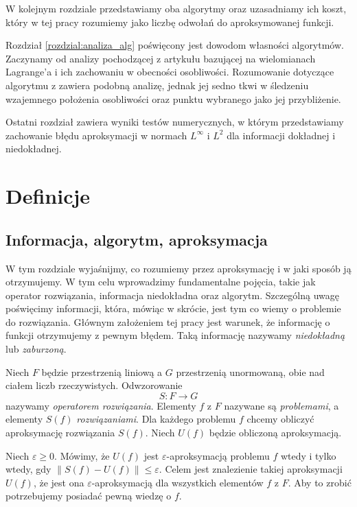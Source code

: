\documentclass[oik, pdftex, man]{mgrwms}
\begin{document}
\begin{wstep}[Wprowadzenie]
    W kolejnym rozdziale przedstawiamy oba algorytmy oraz uzasadniamy ich koszt, który w tej pracy rozumiemy jako liczbę odwołań do aproksymowanej funkcji.

    Rozdział \ref{rozdzial:analiza_alg} poświęcony jest dowodom własności algorytmów. Zaczynamy od analizy pochodzącej z artykułu \cite{CoDF} bazującej na wielomianach Lagrange'a i ich zachowaniu w obecności osobliwości. Rozumowanie dotyczące algorytmu z \cite{AoP} zawiera podobną analizę, jednak jej sedno tkwi w śledzeniu wzajemnego położenia osobliwości oraz punktu wybranego jako jej przybliżenie.

    Ostatni rozdział zawiera wyniki testów numerycznych, w którym przedstawiamy zachowanie błędu aproksymacji w normach $L^{\infty}$ i $L^{2}$ dla informacji dokładnej i niedokładnej.

\end{wstep}


\chapter{Definicje}


\section{Informacja, algorytm, aproksymacja}


    W tym rozdziale wyjaśnijmy, co rozumiemy przez aproksymację i w jaki sposób ją otrzymujemy. W tym celu wprowadzimy fundamentalne pojęcia, takie jak operator rozwiązania, informacja niedokładna oraz algorytm. Szczególną uwagę poświęcimy informacji, która, mówiąc w skrócie, jest tym co wiemy o problemie do rozwiązania. Głównym założeniem tej pracy jest warunek, że informację o funkcji otrzymujemy z pewnym błędem. Taką informację nazywamy \textit{niedokładną} lub \textit{zaburzoną}.

    Niech $F$ będzie przestrzenią liniową a $G$ przestrzenią unormowaną, obie nad ciałem liczb rzeczywistych. Odwzorowanie 
    \begin{equation*}
        S : F \rightarrow G
    \end{equation*}
    nazywamy \textit{operatorem rozwiązania}. Elementy $f$ z $F$ nazywane są \textit{problemami}, a elementy $S(f)$ \textit{rozwiązaniami}. Dla każdego problemu $f$ chcemy obliczyć aproksymację rozwiązania $S(f)$. Niech $U(f)$ będzie obliczoną aproksymacją.

    Niech $\varepsilon \geq 0$. Mówimy, że $U(f)$ jest $\varepsilon$-aproksymacją problemu $f$ wtedy i tylko wtedy, gdy $\| S(f) -  U(f)\| \leq \varepsilon$. Celem jest znalezienie takiej aproksymacji $U(f)$, że jest ona $\varepsilon$-aproksymacją dla wszystkich elementów $f$ z $F$. Aby to zrobić potrzebujemy posiadać pewną wiedzę o $f$.
\end{document}
